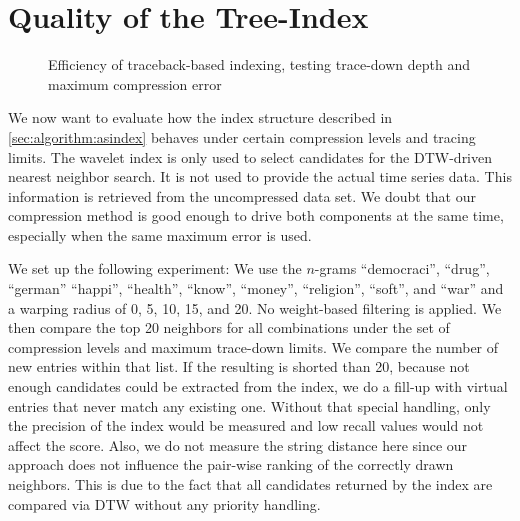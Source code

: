 \section{Quality of the Tree-Index}
\label{sec:evaluation:tb}

\begin{figure}
    \centering
    
    \caption{Efficiency of traceback-based indexing, testing trace-down depth and maximum compression error}\label{fig:tbindex}
\end{figure}

We now want to evaluate how the index structure described in \autoref{sec:algorithm:asindex} behaves under certain compression levels and tracing limits. The wavelet index is only used to select candidates for the DTW-driven nearest neighbor search. It is not used to provide the actual time series data. This information is retrieved from the uncompressed data set. We doubt that our compression method is good enough to drive both components at the same time, especially when the same maximum error is used.

We set up the following experiment: We use the $n$-grams \enquote{democraci}, \enquote{drug}, \enquote{german} \enquote{happi}, \enquote{health}, \enquote{know}, \enquote{money}, \enquote{religion}, \enquote{soft}, and \enquote{war} and a warping radius of \num{0}, \num{5}, \num{10}, \num{15}, and \num{20}. No weight-based filtering is applied. We then compare the top \num{20} neighbors for all combinations under the set of compression levels and maximum trace-down limits. We compare the number of new entries within that list. If the resulting is shorted than \num{20}, because not enough candidates could be extracted from the index, we do a fill-up with virtual entries that never match any existing one. Without that special handling, only the precision of the index would be measured and low recall values would not affect the score. Also, we do not measure the string distance here since our approach does not influence the pair-wise ranking of the correctly drawn neighbors. This is due to the fact that all candidates returned by the index are compared via DTW without any priority handling.

